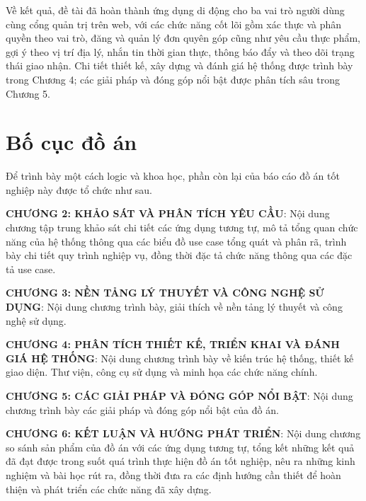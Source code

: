 \documentclass[../main.tex]{subfiles}%
\begin{document}
Về kết quả, đề tài đã hoàn thành ứng dụng di động cho ba vai trò người dùng cùng cổng quản trị trên web, với các chức năng cốt lõi gồm xác thực và phân quyền theo vai trò, đăng và quản lý đơn quyên góp cũng như yêu cầu thực phẩm, gợi ý theo vị trí địa lý, nhắn tin thời gian thực, thông báo đẩy và theo dõi trạng thái giao nhận. Chi tiết thiết kế, xây dựng và đánh giá hệ thống được trình bày trong Chương 4; các giải pháp và đóng góp nổi bật được phân tích sâu trong Chương 5.

\section{Bố cục đồ án}%
\label{section:1.4}
Để trình bày một cách logic và khoa học, phần còn lại của báo cáo đồ án tốt nghiệp này được tổ chức như sau.

\textbf{\MakeUppercase{Chương 2: Khảo sát và phân tích yêu cầu}}: Nội dung chương tập trung khảo sát chi tiết các ứng dụng tương tự, mô tả tổng quan chức năng của hệ thống thông qua các biểu đồ use case tổng quát và phân rã, trình bày chi tiết quy trình nghiệp vụ, đồng thời đặc tả chức năng thông qua các đặc tả use case.

\textbf{\MakeUppercase{Chương 3: Nền tảng lý thuyết và công nghệ sử dụng}}: Nội dung chương trình bày, giải thích về nền tảng lý thuyết và công nghệ sử dụng.

\textbf{\MakeUppercase{Chương 4: Phân tích thiết kế, triển khai và đánh giá hệ thống}}: Nội dung chương trình bày về kiến trúc hệ thống, thiết kế giao diện. Thư viện, công cụ sử dụng và minh họa các chức năng chính.

\textbf{\MakeUppercase{Chương 5: Các giải pháp và đóng góp nổi bật}}: Nội dung chương trình bày các giải pháp và đóng góp nổi bật của đồ án.

\textbf{\MakeUppercase{Chương 6: Kết luận và hướng phát triển}}: Nội dung chương so sánh sản phẩm của đồ án với các ứng dụng tương tự, tổng kết những kết quả đã đạt được trong suốt quá trình thực hiện đồ án tốt nghiệp, nêu ra những kinh nghiệm và bài học rút ra, đồng thời đưa ra các định hướng cần thiết để hoàn thiện và phát triển các chức năng đã xây dựng.

\ifSubfilesClassLoaded{\printbibliography{}}{}
\end{document}
